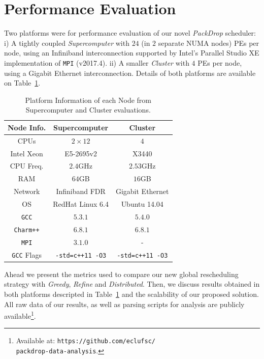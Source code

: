 \section{Performance Evaluation} \label{sec:eval}

Two platforms were for performance evaluation of our novel \textit{PackDrop} scheduler:
i) A tightly coupled \textit{Supercomputer} with $24$ (in $2$ separate NUMA nodes) PEs per node, using an Infiniband interconnection supported by Intel's Parallel Studio XE implementation of \texttt{MPI} (v2017.4).
ii) A smaller \textit{Cluster} with $4$ PEs per node, using a Gigabit Ethernet interconnection.
Details of both platforms are available on Table~\ref{tab:ptinfo}.

\begin{table}[ht]
    \centering
    \caption{Platform Information of each Node from Supercomputer and Cluster evaluations.}
	\begin{tabular}{c|c|c}
	Node Info.	 		& Supercomputer 		& Cluster \\ \hline
        CPUs	   			& $2\times12$ 			& $4$ \\
        Intel Xeon			& E5-2695v2 			& X3440\\
        CPU Freq.  			& $2.4$GHz   			& $2.53$GHz\\
        RAM        			& $64$GB			& $16$GB\\
        Network 			& Infiniband FDR 		& Gigabit Ethernet\\
        OS      			& RedHat Linux 6.4 		& Ubuntu 14.04\\
        \texttt{GCC}			& $5.3.1$			& $5.4.0$\\
        \texttt{Charm++} 		& $6.8.1$ 			& $6.8.1$\\
        \texttt{MPI}			& $3.1.0$			& -\\
        \texttt{GCC} Flags		& \texttt{-std=c++11 -O3} 	& \texttt{-std=c++11 -O3} \\
	\end{tabular}
    \label{tab:ptinfo}
\end{table}

Ahead we present the metrics used to compare our new global rescheduling strategy with \textit{Greedy}, \textit{Refine} and \textit{Distributed}.
Then, we discuss results obtained in both platforms descripted in Table~\ref{tab:ptinfo} and the scalability of our proposed solution.
All raw data of our results, as well as parsing scripts for analysis are publicly available\footnote{Available at: \texttt{https://github.com/eclufsc/\\packdrop-data-analysis}.}.

